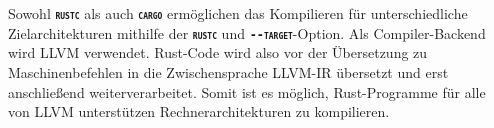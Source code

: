 Sowohl \texttt{\textsc{\textbf{rustc}}} als auch \texttt{\textsc{\textbf{cargo}}} ermöglichen das Kompilieren für
unterschiedliche Zielarchitekturen mithilfe der \texttt{\textsc{\textbf{rustc}}} und
\texttt{\textsc{\textbf{-{}-target}}}-Option. Als Compiler-Backend wird LLVM verwendet.
Rust-Code wird also vor der Übersetzung zu Maschinenbefehlen in die Zwischensprache
LLVM-IR übersetzt und erst anschließend weiterverarbeitet. Somit ist es möglich, Rust-Programme für alle von LLVM
unterstützen Rechnerarchitekturen zu kompilieren.\cite{rustGPU}











